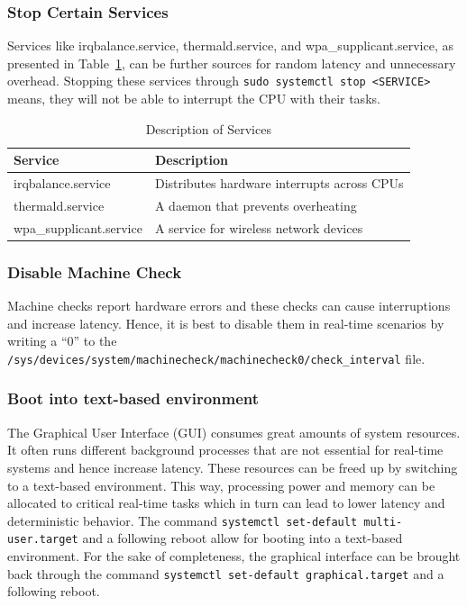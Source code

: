 \documentclass[MMR,Master,english]{twbook}
\begin{document}
\clearpage

\subsubsection{Stop Certain Services}
Services like irqbalance.service, thermald.service, and wpa\_supplicant.service, as presented in Table~\ref{tab:stop_servies}, can be further sources for random latency and unnecessary overhead. Stopping these services through \texttt{sudo systemctl stop <SERVICE>} means, they will not be able to interrupt the CPU with their tasks.

\begin{table}[H]
	\centering
	\caption{Description of Services}
	\label{tab:stop_servies}
	\setlength{\tabcolsep}{0.5em} %
	{\renewcommand{\arraystretch}{1.2}%
		\begin{tabular}{|l|l|}
			\hline
			\textbf{Service}        & \textbf{Description}                        \\
			\hline
			irqbalance.service      & Distributes hardware interrupts across CPUs \\\hline
			thermald.service        & A daemon that prevents overheating          \\\hline
			wpa\_supplicant.service & A service for wireless network devices      \\
			\hline
		\end{tabular}}
\end{table}
\subsubsection{Disable Machine Check}
Machine checks report hardware errors and these checks can cause interruptions and increase latency. Hence, it is best to disable them in real-time scenarios by writing a ``0'' to the \texttt{/sys/devices/system/machinecheck/machinecheck0/check\_interval} file.

\subsubsection{Boot into text-based environment}
The Graphical User Interface (GUI) consumes great amounts of system resources. It often runs different background processes that are not essential for real-time systems and hence increase latency. These resources can be freed up by switching to a text-based environment. This way, processing power and memory can be allocated to critical real-time tasks which in turn can lead to lower latency and deterministic behavior. The command \texttt{systemctl set-default multi-user.target} and a following reboot allow for booting into a text-based environment. For the sake of completeness, the graphical interface can be brought back through the command \texttt{systemctl set-default graphical.target} and a following reboot.
\end{document}
